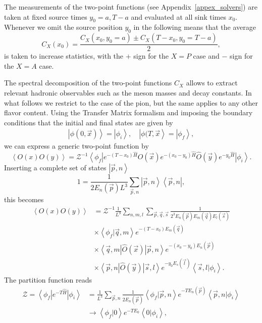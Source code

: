 The measurements of the two-point functions (see Appendix~\ref{appex_solvers}) are taken at fixed source times $y_0=a,T-a$ and evaluated at all sink times $x_0$. Whenever we omit the source position $y_0$ in the following means that the average
\begin{equation}
C_X(x_0)=\frac{C_X(x_0,y_0=a)\pm C_X(T-x_0,y_0=T-a)}{2},
\end{equation}
is taken to increase statistics, with the $+$ sign for the $X=P$ case and $-$ sign for the $X=A$ case.

The spectral decomposition of the two-point functions $C_X$ allows to extract relevant hadronic observables such as the meson masses and decay constants. In what follows we restrict to the case of the pion, but the same applies to any other flavor content. Using the Transfer Matrix formalism and imposing the boundary conditions that the initial and final states are given by
\begin{gather}
\left|\phi(0,\vec{x})\right>=\left|\phi_i\right>, \quad \left|\phi(T,\vec{x}\right>=\left|\phi_f\right>,
\end{gather}
we can express a generic two-point function by
\begin{equation}
\label{ch_observables:eq:spectral}
\left<O(x)O(y)\right>=\mathcal{Z}^{-1}\left<\phi_f\right|e^{-(T-x_0)\hat{H}}\hat{O}(\vec{x})e^{-(x_0-y_0)\hat{H}}\hat{O}(\vec{y})e^{-y_0\hat{H}}\left|\phi_i\right>.
\end{equation}
Inserting a complete set of states $\left|\vec{p},n\right>$
\begin{equation}
1=\frac{1}{2E_n(\vec{p})L^3}\sum_{\vec{p},n}\left|\vec{p},n\right>\left<\vec{p},n\right|,
\end{equation}
this becomes
\begin{align}
\left<O(x)O(y)\right>&=\mathcal{Z}^{-1}\frac{1}{L^9}\sum_{n,m,l}\sum_{\vec{p},\vec{q},\vec{s}}\frac{1}{2^3E_n(\vec{p})E_m(\vec{q})E_l(\vec{s})} \\
&\times\left<\phi_f|\vec{q},m\right>e^{-(T-x_0)E_m(\vec{q})} \\
&\times\left<\vec{q},m\right|\hat{O}(\vec{x})\left|\vec{p},n\right>e^{-(x_0-y_0)E_n(\vec{p})} \\
&\times\left<\vec{p},n\right|\hat{O}(\vec{y})\left|\vec{s},l\right>e^{-y_0E_s(\vec{l})}\left<\vec{s},l|\phi_i\right>.
\end{align}
The partition function reads
\begin{align}
\mathcal{Z}=\left<\phi_f\right|e^{-T\hat{H}}\left|\phi_i\right>&=\frac{1}{L^3}\sum_{\vec{p},n}\frac{1}{2E_n(\vec{p})}\left<\phi_f|\vec{p},n\right>e^{-TE_n(\vec{p})}\left<\vec{p},n|\phi_i\right>\\&\rightarrow\left<\phi_f|0\right>e^{-TE_0}\left<0|\phi_i\right>,
\end{align}
